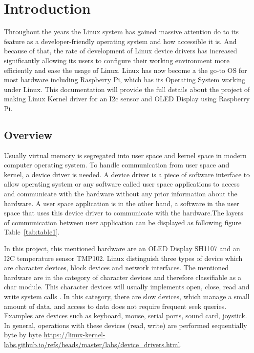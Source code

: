 \chapter{Introduction}
Throughout the years the Linux system has gained massive attention do to its feature as a developer-friendly operating system and how accessible it is. And because of that, the rate of development of Linux device drivers has increased significantly allowing its users to configure their working environment more efficiently and ease the usage of Linux. Linux has now become a the go-to OS for most hardware including Raspberry Pi, which has its Operating System working under Linux. This documentation will provide the full details about the project of making Linux Kernel driver for an I2c sensor and OLED Display using Raspberry Pi.

\section{Overview}
Usually virtual memory is segregated into user space and kernel space in modern computer operating system. To handle communication from user space and kernel, a device driver is needed. A device driver is a piece of software interface to allow operating system or any software called user space applications to access and communicate with the hardware without any prior information about the hardware. A user space application is in the other hand, a software in the user space that uses this device driver to communicate with the hardware.The layers of communication between user application can be displayed as following figure Table~\ref{tab:table1}.

In this project, this mentioned hardware are an OLED Display SH1107 and an I2C temperature sensor TMP102. Linux distinguish three types of device which are character devices, block devices and network interfaces. The mentioned hardware are in the category of character devices and therefore classifiable as a char module. This character devices will usually implements open, close, read and write system calls \cite{rubini_linux_2001}
. In this category, there are slow devices, which manage a small amount of data, and access to data does not require frequent seek queries. Examples are devices such as keyboard, mouse, serial ports, sound card, joystick. In general, operations with these devices (read, write) are performed sequentially byte by byte \url{https://linux-kernel-labs.github.io/refs/heads/master/labs/device_drivers.html}. \\


